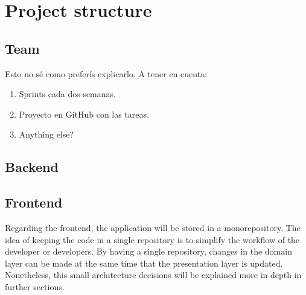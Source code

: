 \documentclass[../memory.tex]{subfiles}
\begin{document}
\chapter{Project structure}
\section{Team}
Esto no sé como preferís explicarlo. A tener en cuenta:
\begin{enumerate}[label = -]
	\item Sprints cada dos semanas.
	\item Proyecto en GitHub con las tareas.
	\item Anything else?
\end{enumerate}
\section{Backend}
\section{Frontend}
Regarding the frontend, the application will be stored in a monorepository. The
idea of keeping the code in a single repository is to simplify the workflow of
the developer or developers. By having a single repository, changes in the
domain layer can be made at the same time that the presentation layer is
updated. Nonetheless, this small architecture decisions will be explained more
in depth in further sections.
\end{document}
